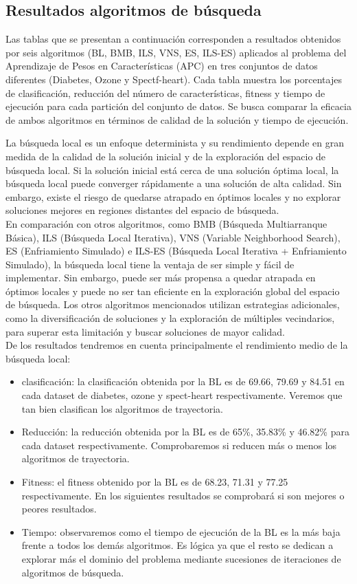 \subsection{Resultados algoritmos de búsqueda}
Las tablas que se presentan a continuación corresponden a resultados obtenidos por seis algoritmos (BL, BMB, ILS, VNS, ES, ILS-ES) aplicados al problema del Aprendizaje de Pesos en Características (APC) en tres conjuntos de datos diferentes (Diabetes, Ozone y Spectf-heart). Cada tabla muestra los porcentajes de clasificación, reducción del número de características, fitness y tiempo de ejecución para cada partición del conjunto de datos. Se busca comparar la eficacia de ambos algoritmos en términos de calidad de la solución y tiempo de ejecución.


La búsqueda local es un enfoque determinista y su rendimiento depende en gran medida de la calidad de la solución inicial y de la exploración del espacio de búsqueda local. Si la solución inicial está cerca de una solución óptima local, la búsqueda local puede converger rápidamente a una solución de alta calidad. Sin embargo, existe el riesgo de quedarse atrapado en óptimos locales y no explorar soluciones mejores en regiones distantes del espacio de búsqueda.\\

En comparación con otros algoritmos, como BMB (Búsqueda Multiarranque Básica), ILS (Búsqueda Local Iterativa), VNS (Variable Neighborhood Search), ES (Enfriamiento Simulado) e ILS-ES (Búsqueda Local Iterativa + Enfriamiento Simulado), la búsqueda local tiene la ventaja de ser simple y fácil de implementar. Sin embargo, puede ser más propensa a quedar atrapada en óptimos locales y puede no ser tan eficiente en la exploración global del espacio de búsqueda. Los otros algoritmos mencionados utilizan estrategias adicionales, como la diversificación de soluciones y la exploración de múltiples vecindarios, para superar esta limitación y buscar soluciones de mayor calidad.\\

De los resultados tendremos en cuenta principalmente el rendimiento medio de la búsqueda local:
\begin{itemize}
	\item clasificación: la clasificación obtenida por la BL es de 69.66, 79.69 y 84.51 en cada dataset de diabetes, ozone y spect-heart respectivamente. Veremos que tan bien clasifican los algoritmos de trayectoria.
	\item Reducción: la reducción obtenida por la BL es de 65\%, 35.83\% y 46.82\% para cada dataset respectivamente. Comprobaremos si reducen más o menos los algoritmos de trayectoria.
	\item Fitness: el fitness obtenido por la BL es de 68.23, 71.31 y 77.25 respectivamente. En los siguientes resultados se comprobará si son mejores o peores resultados.
	\item Tiempo: observaremos como el tiempo de ejecución de la BL es la más baja frente a todos los demás algoritmos. Es lógica ya que el resto se dedican a explorar más el dominio del problema mediante sucesiones de iteraciones de algoritmos de búsqueda.
\end{itemize}

